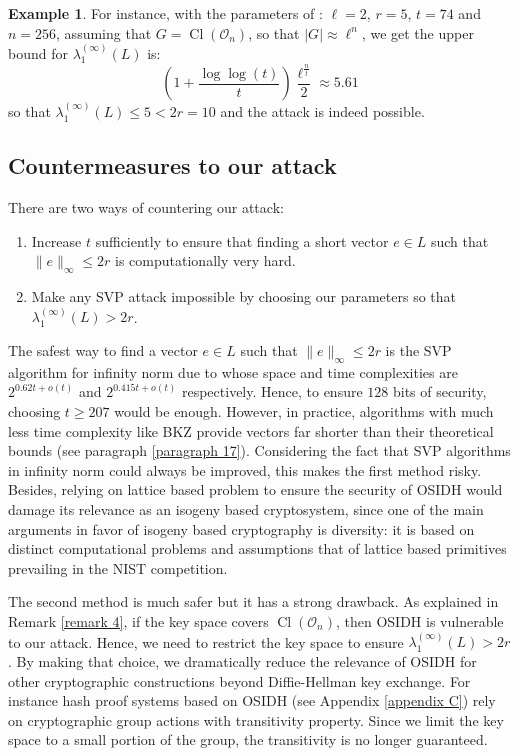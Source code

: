 \documentclass[a4paper,10pt]{report}
\theoremstyle{definition}
\theoremstyle{plain}
\theoremstyle{definition}
\newtheorem{example}[definition]{Example}
\newcommand{\mO}{\mathcal{O}}
\renewcommand{\(}{\left(}
\renewcommand{\)}{\right)}
\DeclareMathOperator{\Cl}{Cl}
\begin{document}
\begin{example}
For instance, with the parameters of \cite[p. 28]{OSIDH}: $\ell=2$, $r=5$, $t=74$ and $n=256$, assuming that $G=\Cl(\mO_n)$, so that $|G|\approx\ell^n$, we get the upper bound for $\lambda_1^{(\infty)}(L)$ is:
\[\(1+\frac{\log\log(t)}{t}\)\frac{\ell^{\frac{n}{t}}}{2}\approx 5.61\]
so that $\lambda_1^{(\infty)}(L)\leq 5<2r=10$ and the attack is indeed possible.
\end{example}

\subsection{Countermeasures to our attack}

There are two ways of countering our attack: 
\begin{enumerate}
\item Increase $t$ sufficiently to ensure that finding a short vector $e\in L$ such that $\|e\|_\infty\leq 2r$ is computationally very hard.
\item Make any SVP attack impossible by choosing our parameters so that $\lambda_1^{(\infty)}(L)>2r$. 
\end{enumerate}

The safest way to find a vector $e\in L$ such that $\|e\|_\infty\leq 2r$ is the SVP algorithm for infinity norm due to \cite{Aggarwal2018} whose space and time complexities are $2^{0.62t+o(t)}$ and $2^{0.415t+o(t)}$ respectively. Hence, to ensure $128$ bits of security, choosing $t\geq 207$ would be enough. However, in practice, algorithms with much less time complexity like BKZ \cite{BKZ} provide vectors far shorter than their theoretical bounds (see paragraph \ref{paragraph 17}). Considering the fact that SVP algorithms in infinity norm could always be improved, this makes the first method risky. Besides, relying on lattice based problem to ensure the security of OSIDH would damage its relevance as an isogeny based cryptosystem, since one of the main arguments in favor of isogeny based cryptography is diversity: it is based on distinct computational problems and assumptions that of lattice based primitives prevailing in the NIST competition.

The second method is much safer but it has a strong drawback. As explained in Remark \ref{remark 4}, if the key space covers $\Cl(\mO_n)$, then OSIDH is vulnerable to our attack. Hence, we need to restrict the key space to ensure $\lambda_1^{(\infty)}(L)>2r$. By making that choice, we dramatically reduce the relevance of OSIDH for other cryptographic constructions beyond Diffie-Hellman key exchange. For instance hash proof systems based on OSIDH (see Appendix \ref{appendix C}) rely on cryptographic group actions with transitivity property. Since we limit the key space to a small portion of the group, the transitivity is no longer guaranteed.
\end{document}
